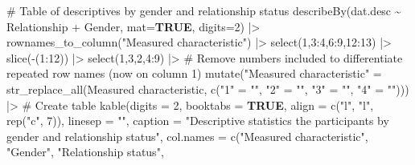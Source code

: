 \documentclass[
  bookmarksnumbered]{article}
\newenvironment{Shaded}{\begin{snugshade}}{\end{snugshade}}
\newcommand{\AttributeTok}[1]{\textcolor[rgb]{0.80,0.80,0.80}{#1}}
\newcommand{\CommentTok}[1]{\textcolor[rgb]{0.50,0.62,0.50}{#1}}
\newcommand{\ConstantTok}[1]{\textcolor[rgb]{0.86,0.64,0.64}{\textbf{#1}}}
\newcommand{\DecValTok}[1]{\textcolor[rgb]{0.86,0.86,0.80}{#1}}
\newcommand{\FunctionTok}[1]{\textcolor[rgb]{0.94,0.94,0.56}{#1}}
\newcommand{\NormalTok}[1]{\textcolor[rgb]{0.80,0.80,0.80}{#1}}
\newcommand{\OtherTok}[1]{\textcolor[rgb]{0.94,0.94,0.56}{#1}}
\newcommand{\SpecialCharTok}[1]{\textcolor[rgb]{0.86,0.64,0.64}{#1}}
\newcommand{\StringTok}[1]{\textcolor[rgb]{0.80,0.58,0.58}{#1}}
\begin{document}
\begin{Shaded}
\begin{Highlighting}[]
\CommentTok{\# Table of descriptives by gender and relationship status}
\FunctionTok{describeBy}\NormalTok{(dat.desc }\SpecialCharTok{\textasciitilde{}}\NormalTok{ Relationship }\SpecialCharTok{+}\NormalTok{ Gender,}
           \AttributeTok{mat=}\ConstantTok{TRUE}\NormalTok{,}
           \AttributeTok{digits=}\DecValTok{2}\NormalTok{)  }\SpecialCharTok{|\textgreater{}} 
  \FunctionTok{rownames\_to\_column}\NormalTok{(}\StringTok{"Measured characteristic"}\NormalTok{) }\SpecialCharTok{|\textgreater{}}
  \FunctionTok{select}\NormalTok{(}\DecValTok{1}\NormalTok{,}\DecValTok{3}\SpecialCharTok{:}\DecValTok{4}\NormalTok{,}\DecValTok{6}\SpecialCharTok{:}\DecValTok{9}\NormalTok{,}\DecValTok{12}\SpecialCharTok{:}\DecValTok{13}\NormalTok{) }\SpecialCharTok{|\textgreater{}} 
  \FunctionTok{slice}\NormalTok{(}\SpecialCharTok{{-}}\NormalTok{(}\DecValTok{1}\SpecialCharTok{:}\DecValTok{12}\NormalTok{)) }\SpecialCharTok{|\textgreater{}} 
  \FunctionTok{select}\NormalTok{(}\DecValTok{1}\NormalTok{,}\DecValTok{3}\NormalTok{,}\DecValTok{2}\NormalTok{,}\DecValTok{4}\SpecialCharTok{:}\DecValTok{9}\NormalTok{) }\SpecialCharTok{|\textgreater{}} 
  \CommentTok{\# Remove numbers included to differentiate repeated row names (now on column 1)}
  \FunctionTok{mutate}\NormalTok{(}\StringTok{"Measured characteristic"} \OtherTok{=} \FunctionTok{str\_replace\_all}\NormalTok{(}\StringTok{\textasciigrave{}}\AttributeTok{Measured characteristic}\StringTok{\textasciigrave{}}\NormalTok{,}
                                                     \FunctionTok{c}\NormalTok{(}\StringTok{"1"} \OtherTok{=} \StringTok{""}\NormalTok{, }\StringTok{"2"} \OtherTok{=} \StringTok{""}\NormalTok{, }\StringTok{"3"} \OtherTok{=} \StringTok{""}\NormalTok{, }\StringTok{"4"} \OtherTok{=} \StringTok{""}\NormalTok{))) }\SpecialCharTok{|\textgreater{}} 
  \CommentTok{\# Create table}
  \FunctionTok{kable}\NormalTok{(}\AttributeTok{digits =} \DecValTok{2}\NormalTok{,}
        \AttributeTok{booktabs =} \ConstantTok{TRUE}\NormalTok{,}
        \AttributeTok{align =} \FunctionTok{c}\NormalTok{(}\StringTok{"l"}\NormalTok{, }\StringTok{"l"}\NormalTok{, }\FunctionTok{rep}\NormalTok{(}\StringTok{"c"}\NormalTok{, }\DecValTok{7}\NormalTok{)),}
        \AttributeTok{linesep =} \StringTok{""}\NormalTok{,}
        \AttributeTok{caption =} \StringTok{"Descriptive statistics the participants by gender}
\StringTok{        and relationship status"}\NormalTok{,}
        \AttributeTok{col.names =} \FunctionTok{c}\NormalTok{(}\StringTok{"Measured characteristic"}\NormalTok{, }\StringTok{"Gender"}\NormalTok{, }\StringTok{"Relationship status"}\NormalTok{,}

\end{Highlighting}
\end{Shaded}
\end{document}
